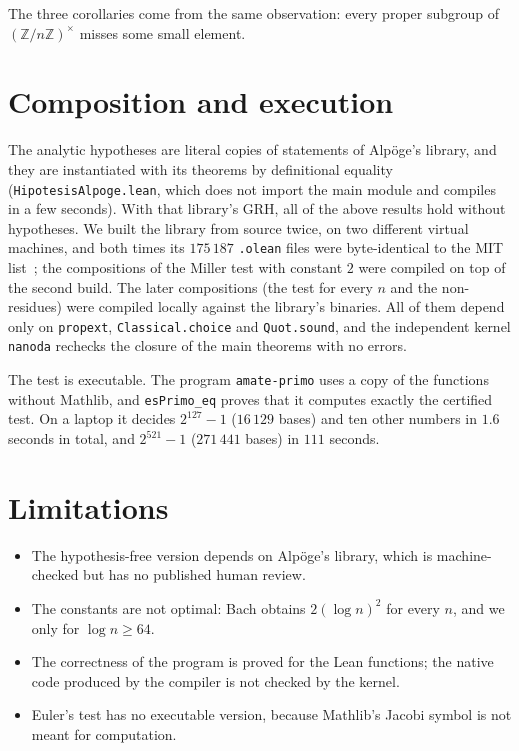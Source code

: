 \documentclass[11pt,a4paper]{amsart}
\theoremstyle{remark}
\newcommand{\Z}{\mathbb{Z}}
\begin{document}
The three corollaries come from the same observation: every proper subgroup of $(\Z/n\Z)^\times$ misses some small element.

\section{Composition and execution}

The analytic hypotheses are literal copies of statements of Alp\"oge's library, and they are instantiated with its theorems by definitional equality (\texttt{HipotesisAlpoge.lean}, which does not import the main module and compiles in a few seconds). With that library's GRH, all of the above results hold without hypotheses. We built the library from source twice, on two different virtual machines, and both times its $175\,187$ \texttt{.olean} files were byte-identical to the MIT list~\cite{MIT}; the compositions of the Miller test with constant $2$ were compiled on top of the second build. The later compositions (the test for every $n$ and the non-residues) were compiled locally against the library's binaries. All of them depend only on \texttt{propext}, \texttt{Classical.choice} and \texttt{Quot.sound}, and the independent kernel \texttt{nanoda} rechecks the closure of the main theorems with no errors.

The test is executable. The program \texttt{amate-primo} uses a copy of the functions without Mathlib, and \texttt{esPrimo\_eq} proves that it computes exactly the certified test. On a laptop it decides $2^{127}-1$ ($16\,129$ bases) and ten other numbers in $1.6$ seconds in total, and $2^{521}-1$ ($271\,441$ bases) in $111$ seconds.

\section{Limitations}

\begin{itemize}
\item The hypothesis-free version depends on Alp\"oge's library, which is machine-checked but has no published human review.
\item The constants are not optimal: Bach obtains $2(\log n)^2$ for every $n$, and we only for $\log n\ge64$.
\item The correctness of the program is proved for the Lean functions; the native code produced by the compiler is not checked by the kernel.
\item Euler's test has no executable version, because Mathlib's Jacobi symbol is not meant for computation.
\end{itemize}
\end{document}

